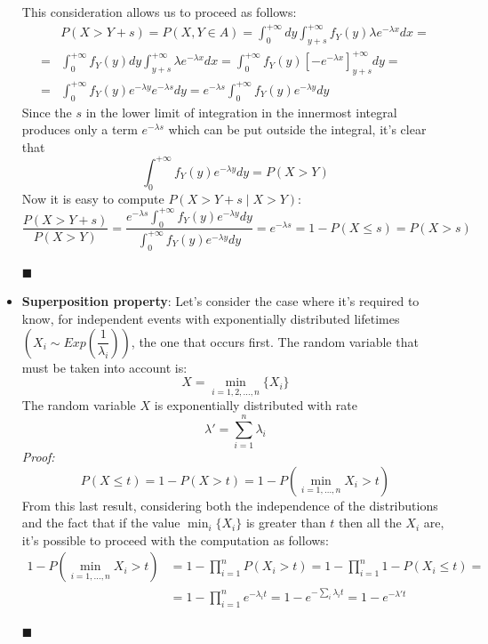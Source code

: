 \documentclass[12pt,a4paper]{article}
\begin{document}
\begin{itemize}
\begin{figure}[H]
\begin{center}
\label{fig:extmemlessarea}
\end{center}
\end{figure}
This consideration allows us to proceed as follows:
\begin{equation*}
\begin{aligned}
&P(X>Y+s) = P(X,Y\in A) = \int_{0}^{+\infty}dy\int_{y+s}^{+\infty}f_Y(y)\lambda e^{-\lambda x}dx= \\
=&\int_{0}^{+\infty}f_Y(y)dy\int_{y+s}^{+\infty}\lambda e^{-\lambda x}dx =\int_{0}^{+\infty}f_Y(y)
\left[-e^{-\lambda x}\right]^{+\infty}_{y+s}dy = \\
=&\int_{0}^{+\infty}f_Y(y)e^{-\lambda y}e^{-\lambda s}dy = e^{-\lambda s}
\int_{0}^{+\infty}f_Y(y)e^{-\lambda y}dy
\end{aligned}
\end{equation*}
Since the $s$ in the lower limit of integration in the innermost integral produces only a term 
$e^{-\lambda s}$ which can be put outside the integral, it's clear that
$$
\int_{0}^{+\infty}f_Y(y)e^{-\lambda y}dy = P(X>Y)
$$
Now it is easy to compute $P(X>Y+s \mid X>Y)$:
$$
\frac{P(X>Y+s)}{P(X>Y)} = \frac{e^{-\lambda s}\int_{0}^{+\infty}f_Y(y)e^{-\lambda y}dy }
{\int_{0}^{+\infty}f_Y(y)e^{-\lambda y}dy } = e^{-\lambda s} = 1-P(X\leq s) = P(X>s)
$$
\begin{flushright}
$\blacksquare$
\end{flushright}

\item \textbf{Superposition property}:
Let's consider the case where it's required to know, for independent events with exponentially distributed lifetimes $\left( X_i\sim Exp\left(\dfrac{1}{\lambda_i}\right)\right)$, the one that occurs first. The random variable that must be taken into account is:
$$
X=\min_{i=1,2,\dots,n}{\{X_i\}}
$$ 
The random variable $X$ is exponentially distributed with rate 
$$
\lambda '=\sum_{i=1}^{n}\lambda_i
$$
\emph{Proof:}
$$
P(X\leq t) = 1-P(X>t) = 1-P(\min_{i=1,\dots,n}{X_i}>t)
$$
From this last result, considering both the independence of the distributions and the fact that if the value $\min_i{\{X_i\}}$ is greater than $t$ then all the $X_i$ are, it's possible to proceed with the computation as follows:
\begin{align*}
1-P(\min_{i=1,\dots,n}{X_i}>t) &= 1-\prod_{i=1}^{n}{P(X_i>t)} = 1-\prod_{i=1}^{n}{1-P(X_i\leq t)} =
\\
&= 1-\prod_{i=1}^{n}{e^{-\lambda_{i}t}} = 1-e^{-\sum_{i}{\lambda_i t}} = 1-e^{-\lambda' t}
\end{align*}
\begin{flushright}
$\blacksquare$
\end{flushright}
\end{itemize}
\end{document}
